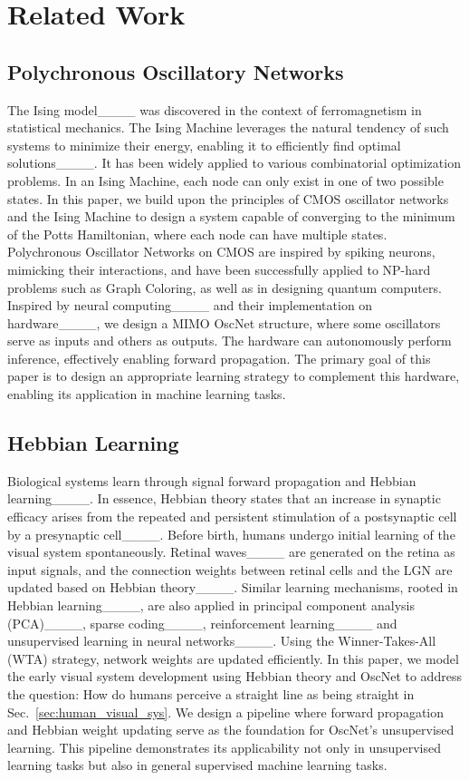 \section{Related Work}
\subsection{Polychronous Oscillatory Networks}
The Ising model____ was discovered in the context of ferromagnetism in statistical mechanics. The Ising Machine leverages the natural tendency of such systems to minimize their energy, enabling it to efficiently find optimal solutions____. It has been widely applied to various combinatorial optimization problems. In an Ising Machine, each node can only exist in one of two possible states.
In this paper, we build upon the principles of CMOS oscillator networks and the Ising Machine to design a system capable of converging to the minimum of the Potts Hamiltonian, where each node can have multiple states. Polychronous Oscillator Networks on CMOS are inspired by spiking neurons, mimicking their interactions, and have been successfully applied to NP-hard problems such as Graph Coloring, as well as in designing quantum computers.
Inspired by neural computing____ and their implementation on hardware____, we design a MIMO OscNet structure, where some oscillators serve as inputs and others as outputs. The hardware can autonomously perform inference, effectively enabling forward propagation. The primary goal of this paper is to design an appropriate learning strategy to complement this hardware, enabling its application in machine learning tasks.

\subsection{Hebbian Learning}
Biological systems learn through signal forward propagation and Hebbian learning____. In essence, Hebbian theory states that an increase in synaptic efficacy arises from the repeated and persistent stimulation of a postsynaptic cell by a presynaptic cell____.
Before birth, humans undergo initial learning of the visual system spontaneously. Retinal waves____ are generated on the retina as input signals, and the connection weights between retinal cells and the LGN are updated based on Hebbian theory____. 
Similar learning mechanisms, rooted in Hebbian learning____, are also applied in principal component analysis (PCA)____, sparse coding____, reinforcement learning____ and unsupervised learning in neural networks____. Using the Winner-Takes-All (WTA) strategy, network weights are updated efficiently.
In this paper, we model the early visual system development using Hebbian theory and OscNet to address the question: How do humans perceive a straight line as being straight in Sec.~\ref{sec:human_visual_sys}. We design a pipeline where forward propagation and Hebbian weight updating serve as the foundation for OscNet's unsupervised learning. This pipeline demonstrates its applicability not only in unsupervised learning tasks but also in general supervised machine learning tasks.